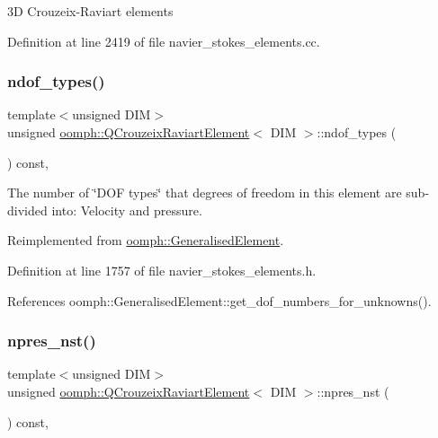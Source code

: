 3D Crouzeix-\/\+Raviart elements 



Definition at line 2419 of file navier\+\_\+stokes\+\_\+elements.\+cc.

\mbox{\label{classoomph_1_1QCrouzeixRaviartElement_ad252ba37ecfb028ccd851ab6600d4df3}} 
\subsubsection{\texorpdfstring{ndof\+\_\+types()}{ndof\_types()}}
{\footnotesize\ttfamily template$<$unsigned D\+IM$>$ \\
unsigned \hyperlink{classoomph_1_1QCrouzeixRaviartElement}{oomph\+::\+Q\+Crouzeix\+Raviart\+Element}$<$ D\+IM $>$\+::ndof\+\_\+types (\begin{DoxyParamCaption}{ }\end{DoxyParamCaption}) const\hspace{0.3cm}{\ttfamily [inline]}, {\ttfamily [virtual]}}



The number of \char`\"{}\+D\+O\+F types\char`\"{} that degrees of freedom in this element are sub-\/divided into\+: Velocity and pressure. 



Reimplemented from \hyperlink{classoomph_1_1GeneralisedElement_a0c6037a870597b35dcf1c780710b9a56}{oomph\+::\+Generalised\+Element}.



Definition at line 1757 of file navier\+\_\+stokes\+\_\+elements.\+h.



References oomph\+::\+Generalised\+Element\+::get\+\_\+dof\+\_\+numbers\+\_\+for\+\_\+unknowns().

\mbox{\label{classoomph_1_1QCrouzeixRaviartElement_a0cbd8f1a5e0814abdbfd34ae7c58b018}} 
\subsubsection{\texorpdfstring{npres\+\_\+nst()}{npres\_nst()}}
{\footnotesize\ttfamily template$<$unsigned D\+IM$>$ \\
unsigned \hyperlink{classoomph_1_1QCrouzeixRaviartElement}{oomph\+::\+Q\+Crouzeix\+Raviart\+Element}$<$ D\+IM $>$\+::npres\+\_\+nst (\begin{DoxyParamCaption}{ }\end{DoxyParamCaption}) const\hspace{0.3cm}{\ttfamily [inline]}, {\ttfamily [virtual]}}



